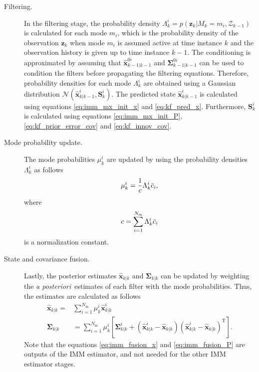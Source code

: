 \documentclass[english, 12pt, a4paper, elec, utf8, a-1b, online]{aaltothesis}
\numberwithin{equation}{section}
\renewcommand{\vec}[1]{\mathbf{#1}}
\newcommand{\xpost}{\hat{\vec{x}}_{k|k}}
\newcommand{\postecov}{\boldsymbol{\Sigma}_{k|k}}
\newcommand{\z}{\vec{z}_k}
\newcommand{\normal}[2]{\mathcal{N}\left(#1, #2 \right)}
\newcommand{\transpose}[1]{#1^\text{T}}
\newcommand{\mxnorm}{ \Bar{c}_i }
\newcommand{\xmxinit}{\hat{\vec{x}}^{0i}_{k-1|k-1}}
\newcommand{\ecovmxinit}{\bm{\Sigma}^{0i}_{k-1|k-1}}
\newcommand{\modexprior}{\hat{\vec{x}}^{i}_{k|k-1}}
\newcommand{\modeinnovcov}{\mathbf{S}^i_{k}}
\newcommand{\modexpost}{\hat{\vec{x}}^{i}_{k|k}}
\newcommand{\modecovpost}{\bm{\Sigma}^i_{k|k}}
\newcommand{\modeobsprob}{\Lambda^i_k}
\def\post{\textit{a posteriori}\ }
\newcommand{\nmodels}{{N_\text{m}}}
\begin{document}
\begin{description}
\item[Filtering.]

In the filtering stage, the probability density $\modeobsprob = p\left( \z | M_k = m_i, \mathcal{Z}_{k-1} \right) $ is calculated for each mode $m_i$, which is the probability density of the observation $\z$ when mode $m_i$ is assumed active at time instance $k$ and the observation history is given up to time instance $k-1$.
The conditioning is approximated by assuming that $\xmxinit$ and $\ecovmxinit$ can be used to condition the filters before propagating the filtering equations.
Therefore, probability densities for each mode $\modeobsprob$ are obtained using a Gaussian distribution $\normal{\modexprior}{\modeinnovcov}$.
The predicted state $\modexprior$ is calculated using equations \eqref{eq:imm_mx_init_x} and \eqref{eq:kf_pred_x}.
Furthermore,  $\modeinnovcov$ is calculated using equations \eqref{eq:imm_mx_init_P}, \eqref{eq:kf_prior_error_cov} and \eqref{eq:kf_innov_cov}.

\item[Mode probability update.]

The mode probabilities $\mu^i_k$ are updated by using the probability densities $\Lambda_k^i$ as follows
\begin{equation}
    \mu_k^i = \frac{1}{c} \Lambda^i_k \mxnorm,
\end{equation}
where
\begin{equation}
    c = \sum_{i=1}^\nmodels \Lambda_k^i \mxnorm
\end{equation}
is a normalization constant.

\item[State and covariance fusion.]
Lastly, the posterior estimates $\xpost$ and $\postecov$ can be updated by weighting the \post estimates of each filter with the mode probabilities.
Thus, the estimates are calculated as follows
\begin{align}\label{eq:imm_fusion_x}
    \xpost =& \sum_{i=1}^\nmodels \mu_k^i \modexpost\\
\label{eq:imm_fusion_P}
    \postecov &= \sum_{i=1}^\nmodels \mu_k^i 
    \left[ 
        \modecovpost + \left( \modexpost - \xpost \right) \transpose{\left( \modexpost - \xpost \right)}
    \right].
\end{align}
Note that the equations \eqref{eq:imm_fusion_x} and \eqref{eq:imm_fusion_P} are outputs of the IMM estimator, and not needed for the other IMM estimator stages.
\end{description}
\end{document}
